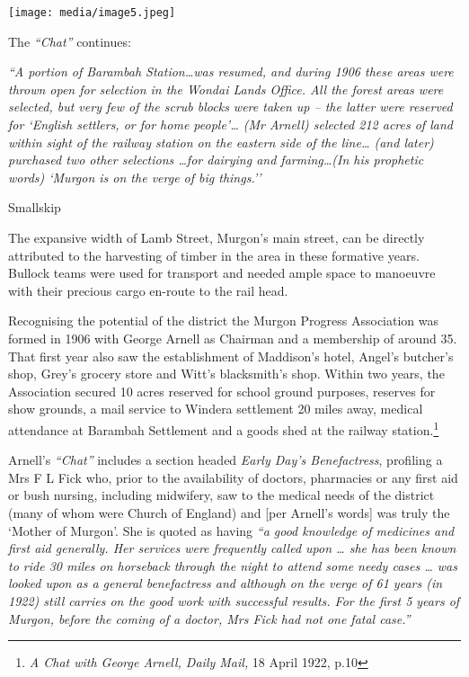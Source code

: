 \texttt{[image: media/image5.jpeg]}

The \emph{``Chat''} continues:

\emph{``A portion of Barambah Station\ldots was resumed, and during 1906 these areas were thrown open for selection in the Wondai Lands Office. All the forest areas were selected, but very few of the scrub blocks were taken up -- the latter were reserved for `English settlers, or for home people'\ldots{} (Mr Arnell) selected 212 acres of land within sight of the railway station on the eastern side of the line\ldots{} (and later) purchased two other selections \ldots for dairying and farming\ldots(In his prophetic words) `Murgon is on the verge of big things.''}

Smallskip

The expansive width of Lamb Street, Murgon's main street, can be directly attributed to the harvesting of timber in the area in these formative years. Bullock teams were used for transport and needed ample space to manoeuvre with their precious cargo en-route to the rail head.

Recognising the potential of the district the Murgon Progress Association was formed in 1906 with George Arnell as Chairman and a membership of around 35. That first year also saw the establishment of Maddison's hotel, Angel's butcher's shop, Grey's grocery store and Witt's blacksmith's shop. Within two years, the Association secured 10 acres reserved for school ground purposes, reserves for show grounds, a mail service to Windera settlement 20 miles away, medical attendance at Barambah Settlement and a goods shed at the railway station.\footnote{\emph{A Chat with George Arnell, Daily Mail,} 18 April 1922, p.10}

Arnell's \emph{``Chat''} includes a section headed \emph{Early Day's Benefactress}, profiling a Mrs F L Fick who, prior to the availability of doctors, pharmacies or any first aid or bush nursing, including midwifery, saw to the medical needs of the district (many of whom were Church of England) and {[}per Arnell's words{]} was truly the `Mother of Murgon'. She is quoted as having \emph{``a good knowledge of medicines and first aid generally. Her services were frequently called upon \ldots{} she has been known to ride 30 miles on horseback through the night to attend some needy cases \ldots{} was looked upon as a general benefactress and although on the verge of 61 years (in 1922) still carries on the good work with successful results. For the first 5 years of Murgon, before the coming of a doctor, Mrs Fick had not one fatal case.''}

